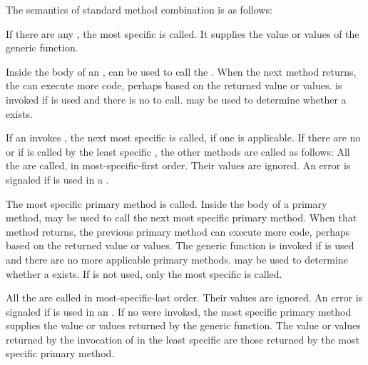 \endlist

The semantics of standard method combination is as follows:

\beginlist
                               
\itemitem{\bull} If there are any , the most specific
 is called.  It supplies the value or values of the
generic function.

\itemitem{\bull} Inside the body of an , 
 can be used to call the .  When the next
method returns, the  can execute more code,
perhaps based on the returned value or values.
 is invoked if  is used and
there is no  to call.  
may be used to determine whether a  exists.

\itemitem{\bull} 
If an  invokes ,
the next most specific 
is called, if one is applicable.  If there are no  
or if  is called by the least
specific , the other methods are called as
follows:
\beginlist
\itemitem{--} All the  are called, in
most-specific-first order.  Their values are ignored.
An error is signaled if  is used in a
.

\itemitem{--} The most specific primary method is called.  Inside the
body of a primary method,  may be used to call
the next most specific primary method.  When that method returns, the
previous primary method can execute more code, perhaps based on the
returned value or values.  The generic function 
is invoked if  is used and there are no more
applicable primary methods.   may be
used to determine whether a  exists.  If 
is not used, only the most specific  is called.

\itemitem{--} All the  are called in
most-specific-last order.  Their values are ignored.
An error is signaled if  is used in an
.
\endlist
\itemitem{\bull} If no  were invoked, the most
specific primary method supplies the value or values returned by the
generic function.  The value or values returned by the invocation of
 in the least specific  are
those returned by the most specific primary method.

